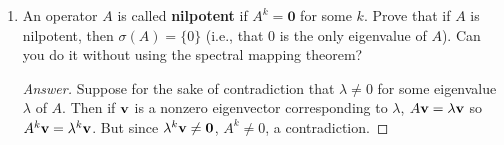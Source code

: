 \documentclass[../psets.tex]{subfiles}
\begin{document}
\begin{enumerate}[label={\textbf{2.\arabic*.}}]
    \item An operator $A$ is called \textbf{nilpotent} if $A^k=\bm{0}$ for some $k$. Prove that if $A$ is nilpotent, then $\sigma(A)=\{0\}$ (i.e., that 0 is the only eigenvalue of $A$). Can you do it without using the spectral mapping theorem?
    \begin{proof}[Answer]
        Suppose for the sake of contradiction that $\lambda\neq 0$ for some eigenvalue $\lambda$ of $A$. Then if $\mathbf{v}$ is a nonzero eigenvector corresponding to $\lambda$, $A\mathbf{v}=\lambda\mathbf{v}$ so $A^k\mathbf{v}=\lambda^k\mathbf{v}$. But since $\lambda^k\mathbf{v}\neq\bm{0}$, $A^k\neq 0$, a contradiction.
    \end{proof}
\end{enumerate}
\end{document}

